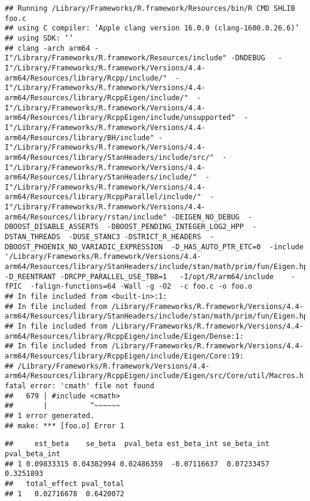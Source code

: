 \documentclass[
]{article}
\newenvironment{Shaded}{\begin{snugshade}}{\end{snugshade}}
\newcommand{\CommentTok}[1]{\textcolor[rgb]{0.56,0.35,0.01}{\textit{#1}}}
\newcommand{\NormalTok}[1]{#1}
\newcommand{\SpecialCharTok}[1]{\textcolor[rgb]{0.81,0.36,0.00}{\textbf{#1}}}
\begin{document}
\begin{verbatim}
## Running /Library/Frameworks/R.framework/Resources/bin/R CMD SHLIB foo.c
## using C compiler: ‘Apple clang version 16.0.0 (clang-1600.0.26.6)’
## using SDK: ‘’
## clang -arch arm64 -I"/Library/Frameworks/R.framework/Resources/include" -DNDEBUG   -I"/Library/Frameworks/R.framework/Versions/4.4-arm64/Resources/library/Rcpp/include/"  -I"/Library/Frameworks/R.framework/Versions/4.4-arm64/Resources/library/RcppEigen/include/"  -I"/Library/Frameworks/R.framework/Versions/4.4-arm64/Resources/library/RcppEigen/include/unsupported"  -I"/Library/Frameworks/R.framework/Versions/4.4-arm64/Resources/library/BH/include" -I"/Library/Frameworks/R.framework/Versions/4.4-arm64/Resources/library/StanHeaders/include/src/"  -I"/Library/Frameworks/R.framework/Versions/4.4-arm64/Resources/library/StanHeaders/include/"  -I"/Library/Frameworks/R.framework/Versions/4.4-arm64/Resources/library/RcppParallel/include/"  -I"/Library/Frameworks/R.framework/Versions/4.4-arm64/Resources/library/rstan/include" -DEIGEN_NO_DEBUG  -DBOOST_DISABLE_ASSERTS  -DBOOST_PENDING_INTEGER_LOG2_HPP  -DSTAN_THREADS  -DUSE_STANC3 -DSTRICT_R_HEADERS  -DBOOST_PHOENIX_NO_VARIADIC_EXPRESSION  -D_HAS_AUTO_PTR_ETC=0  -include '/Library/Frameworks/R.framework/Versions/4.4-arm64/Resources/library/StanHeaders/include/stan/math/prim/fun/Eigen.hpp'  -D_REENTRANT -DRCPP_PARALLEL_USE_TBB=1   -I/opt/R/arm64/include    -fPIC  -falign-functions=64 -Wall -g -O2  -c foo.c -o foo.o
## In file included from <built-in>:1:
## In file included from /Library/Frameworks/R.framework/Versions/4.4-arm64/Resources/library/StanHeaders/include/stan/math/prim/fun/Eigen.hpp:22:
## In file included from /Library/Frameworks/R.framework/Versions/4.4-arm64/Resources/library/RcppEigen/include/Eigen/Dense:1:
## In file included from /Library/Frameworks/R.framework/Versions/4.4-arm64/Resources/library/RcppEigen/include/Eigen/Core:19:
## /Library/Frameworks/R.framework/Versions/4.4-arm64/Resources/library/RcppEigen/include/Eigen/src/Core/util/Macros.h:679:10: fatal error: 'cmath' file not found
##   679 | #include <cmath>
##       |          ^~~~~~~
## 1 error generated.
## make: *** [foo.o] Error 1
\end{verbatim}

\begin{Shaded}
\end{Shaded}

\begin{verbatim}
##     est_beta    se_beta  pval_beta est_beta_int se_beta_int pval_beta_int
## 1 0.09833315 0.04382994 0.02486359  -0.07116637  0.07233457     0.3251893
##   total_effect pval_total
## 1   0.02716678  0.6420072
\end{verbatim}
\end{document}
